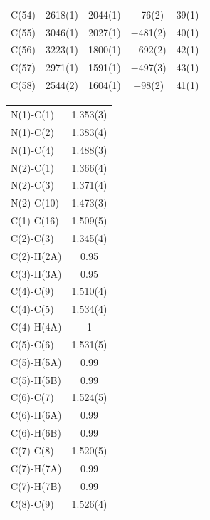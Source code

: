 \begin{center}
{\begin{supertabular}{lcccc}
C(54)&2618(1)&2044(1)&$-$76(2)&39(1)\\
C(55)&3046(1)&2027(1)&$-$481(2)&40(1)\\
C(56)&3223(1)&1800(1)&$-$692(2)&42(1)\\
C(57)&2971(1)&1591(1)&$-$497(3)&43(1)\\
C(58)&2544(2)&1604(1)&$-$98(2)&41(1)\\
\end{supertabular}
}
\end{center}


\begin{center}
\tablefirsthead{%
\toprule}
\tablelasttail{\bottomrule}
{\footnotesize \singlespacing
\begin{supertabular}{p{1.5in}c}
N(1)-C(1) &1.353(3)\\
N(1)-C(2) &1.383(4)\\
N(1)-C(4) &1.488(3)\\
N(2)-C(1) &1.366(4)\\
N(2)-C(3) &1.371(4)\\
N(2)-C(10) &1.473(3)\\
C(1)-C(16) &1.509(5)\\
C(2)-C(3) &1.345(4)\\
C(2)-H(2A) &0.95\\
C(3)-H(3A) &0.95\\
C(4)-C(9) &1.510(4)\\
C(4)-C(5) &1.534(4)\\
C(4)-H(4A) &1\\
C(5)-C(6) &1.531(5)\\
C(5)-H(5A) &0.99\\
C(5)-H(5B) &0.99\\
C(6)-C(7) &1.524(5)\\
C(6)-H(6A) &0.99\\
C(6)-H(6B) &0.99\\
C(7)-C(8) &1.520(5)\\
C(7)-H(7A) &0.99\\
C(7)-H(7B) &0.99\\
C(8)-C(9) &1.526(4)\\

\end{supertabular}}
\end{center}
